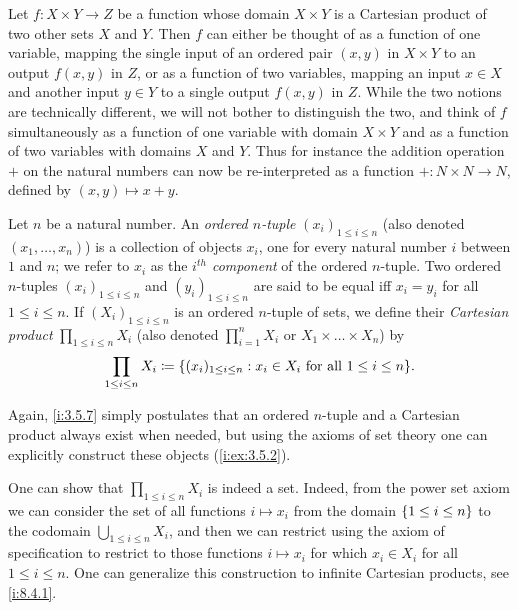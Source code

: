 \begin{note}
  Let \(f : X \times Y \to Z\) be a function whose domain \(X \times Y\) is a Cartesian product of two other sets \(X\) and \(Y\).
  Then \(f\) can either be thought of as a function of one variable, mapping the single input of an ordered pair \((x, y)\) in \(X \times Y\) to an output \(f(x, y)\) in \(Z\), or as a function of two variables, mapping an input \(x \in X\) and another input \(y \in Y\) to a single output \(f(x, y)\) in \(Z\).
  While the two notions are technically different, we will not bother to distinguish the two, and think of \(f\) simultaneously as a function of one variable with domain \(X \times Y\) and as a function of two variables with domains \(X\) and \(Y\).
  Thus for instance the addition operation \(+\) on the natural numbers can now be re-interpreted as a function \(+ : N \times N \to N\), defined by \((x, y) \mapsto x + y\).
\end{note}

\setcounter{thm}{6}
\begin{defn}\label{i:3.5.7}
  Let \(n\) be a natural number.
  An \emph{ordered \(n\)-tuple} \((x_i)_{1 \leq i \leq n}\) (also denoted \((x_1, \dots, x_n)\)) is a collection of objects \(x_i\), one for every natural number \(i\) between \(1\) and \(n\);
  we refer to \(x_i\) as the \emph{\(i^{th}\) component} of the ordered \(n\)-tuple.
  Two ordered \(n\)-tuples \((x_i)_{1 \leq i \leq n}\) and \((y_i)_{1 \leq i \leq n}\) are said to be equal iff \(x_i = y_i\) for all \(1 \leq i \leq n\).
  If \((X_i)_{1 \leq i \leq n}\) is an ordered \(n\)-tuple of sets, we define their \emph{Cartesian product} \(\prod_{1 \leq i \leq n} X_i\) (also denoted \(\prod_{i=1}^n X_i\) or \(X_1 \times \dots \times X_n\)) by
  \[
    \prod_{1 \leq i \leq n} X_i \coloneqq \set{(x_i)_{1 \leq i \leq n} : x_i \in X_i \text{ for all } 1 \leq i \leq n}.
  \]
\end{defn}

\begin{note}
  Again, \cref{i:3.5.7} simply postulates that an ordered \(n\)-tuple and a Cartesian product always exist when needed, but using the axioms of set theory one can explicitly construct these objects (\cref{i:ex:3.5.2}).
\end{note}

\begin{rmk}\label{i:3.5.8}
  One can show that \(\prod_{1 \leq i \leq n} X_i\) is indeed a set.
  Indeed, from the power set axiom we can consider the set of all functions \(i \mapsto x_i\) from the domain \(\left\lbrace1 \leq i \leq n\right\rbrace\) to the codomain \(\bigcup_{1 \leq i \leq n} X_i\), and then we can restrict using the axiom of specification to restrict to those functions \(i \mapsto x_i\) for which \(x_i \in X_i\) for all \(1 \leq i \leq n\).
  One can generalize this construction to infinite Cartesian products, see \cref{i:8.4.1}.
\end{rmk}

